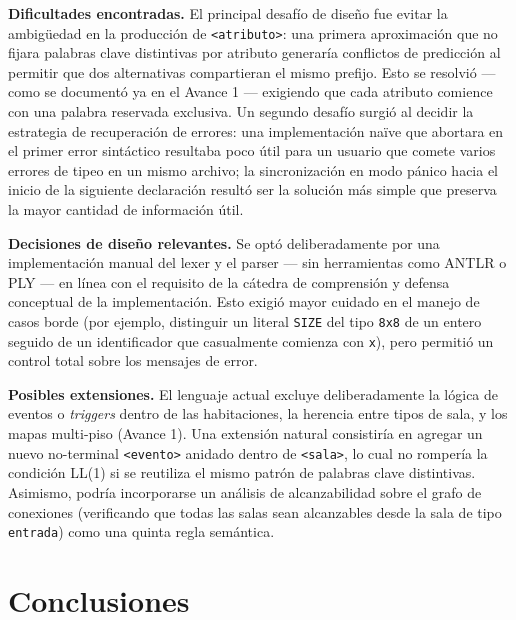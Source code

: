 \documentclass[10pt,twocolumn]{article}
\begin{document}
\textbf{Dificultades encontradas.} El principal desafío de diseño fue
evitar la ambigüedad en la producción de \texttt{<atributo>}: una primera
aproximación que no fijara palabras clave distintivas por atributo
generaría conflictos de predicción al permitir que dos alternativas
compartieran el mismo prefijo. Esto se resolvió --- como se documentó ya
en el Avance 1 --- exigiendo que cada atributo comience con una palabra
reservada exclusiva. Un segundo desafío surgió al decidir la estrategia de
recuperación de errores: una implementación naïve que abortara en el
primer error sintáctico resultaba poco útil para un usuario que comete
varios errores de tipeo en un mismo archivo; la sincronización en modo
pánico hacia el inicio de la siguiente declaración resultó ser la solución
más simple que preserva la mayor cantidad de información útil.

\textbf{Decisiones de diseño relevantes.} Se optó deliberadamente por una
implementación manual del lexer y el parser --- sin herramientas como
ANTLR o PLY --- en línea con el requisito de la cátedra de comprensión y
defensa conceptual de la implementación. Esto exigió mayor cuidado en el
manejo de casos borde (por ejemplo, distinguir un literal \texttt{SIZE}
del tipo \texttt{8x8} de un entero seguido de un identificador que
casualmente comienza con \texttt{x}), pero permitió un control total sobre
los mensajes de error.

\textbf{Posibles extensiones.} El lenguaje actual excluye deliberadamente
la lógica de eventos o \textit{triggers} dentro de las habitaciones, la
herencia entre tipos de sala, y los mapas multi-piso (Avance 1). Una
extensión natural consistiría en agregar un nuevo no-terminal
\texttt{<evento>} anidado dentro de \texttt{<sala>}, lo cual no rompería la
condición LL(1) si se reutiliza el mismo patrón de palabras clave
distintivas. Asimismo, podría incorporarse un análisis de alcanzabilidad
sobre el grafo de conexiones (verificando que todas las salas sean
alcanzables desde la sala de tipo \texttt{entrada}) como una quinta regla
semántica.

\section{Conclusiones}
\end{document}

